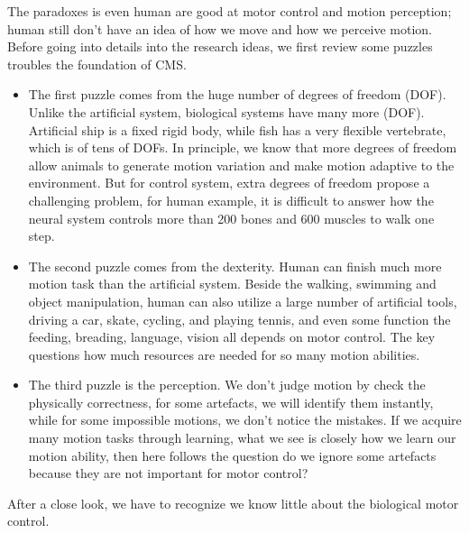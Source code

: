The paradoxes is even human are good at motor control and motion perception; human still don’t have an idea of how we move and how we perceive motion.
Before going into details into the research ideas, we first review some puzzles troubles the foundation of CMS. 
\begin{itemize}
\item The first puzzle comes from the huge number of degrees of freedom (DOF). Unlike the artificial system, biological systems have many more (DOF). Artificial ship is a fixed rigid body, while fish has a very flexible vertebrate, which is of tens of DOFs. In principle, we know that more degrees of freedom allow animals to generate motion variation and make motion adaptive to the environment. But for control system, extra degrees of freedom propose a challenging problem, for human example, it is difficult to answer how the neural  system controls more than 200 bones and 600 muscles to walk one step.
 
\item The second puzzle comes from the dexterity.
Human can finish much more motion task than the artificial system.
Beside the walking, swimming and object manipulation, human can also utilize a large number of artificial tools, driving a car, skate, cycling, and playing tennis, and even some function the feeding, breading, language, vision all depends on motor control. The key questions how much resources are needed for so many motion abilities.

\item The third puzzle is the perception. We don’t judge motion by check the physically correctness, for some artefacts, we will identify them instantly, while for some impossible motions, we don’t notice the mistakes.  If we acquire many motion tasks through learning, what we see is closely how we learn our motion ability, then here follows the  question do we ignore some artefacts because they are not important for motor control?
\end{itemize}
After a close look, we have to recognize we know little about the biological motor control.

